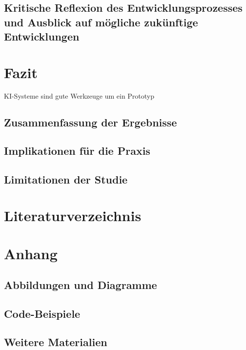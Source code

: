 \documentclass[10pt,a4paper,bibliography=totocnumbered,listof=totocnumbered]{scrartcl}
\begin{document}
\subsection{Kritische Reflexion des Entwicklungsprozesses und Ausblick auf mögliche zukünftige Entwicklungen}
\section{Fazit}
KI-Systeme sind gute Werkzeuge um ein Prototyp
\subsection{Zusammenfassung der Ergebnisse}
\subsection{Implikationen für die Praxis}
\subsection{Limitationen der Studie}
\section{Literaturverzeichnis}
\section{Anhang}
\subsection{Abbildungen und Diagramme}
\subsection{Code-Beispiele}
\subsection{Weitere Materialien}
\end{document}
